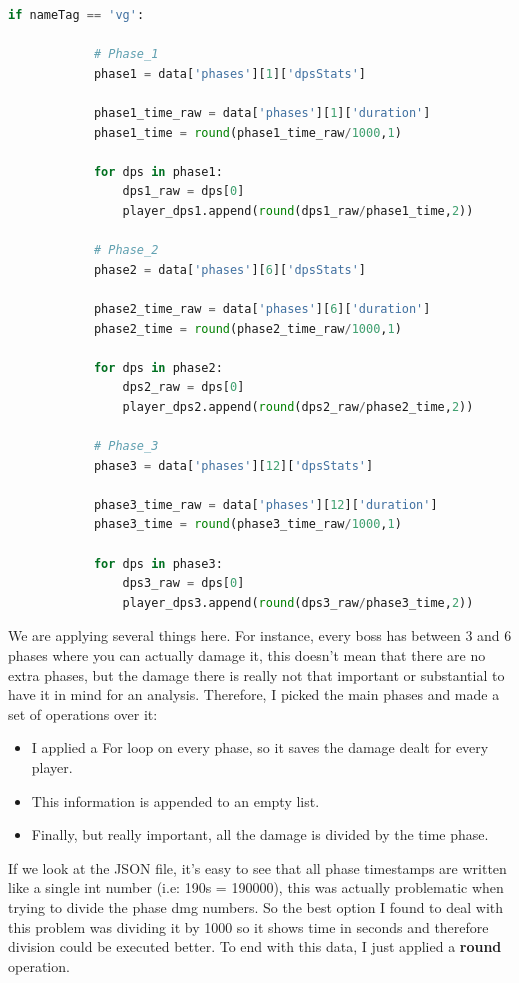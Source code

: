 \documentclass[12pt,a4paper]{article}
\begin{document}
    \begin{lstlisting}[language=Python]
    if nameTag == 'vg':

            # Phase_1
            phase1 = data['phases'][1]['dpsStats']

            phase1_time_raw = data['phases'][1]['duration']
            phase1_time = round(phase1_time_raw/1000,1)

            for dps in phase1:
                dps1_raw = dps[0]
                player_dps1.append(round(dps1_raw/phase1_time,2))

            # Phase_2
            phase2 = data['phases'][6]['dpsStats']

            phase2_time_raw = data['phases'][6]['duration']
            phase2_time = round(phase2_time_raw/1000,1)

            for dps in phase2:
                dps2_raw = dps[0]
                player_dps2.append(round(dps2_raw/phase2_time,2))

            # Phase_3
            phase3 = data['phases'][12]['dpsStats']

            phase3_time_raw = data['phases'][12]['duration']
            phase3_time = round(phase3_time_raw/1000,1)

            for dps in phase3:
                dps3_raw = dps[0]
                player_dps3.append(round(dps3_raw/phase3_time,2))
    \end{lstlisting}

    \newpage

    We are applying several things here. For instance, every boss has between 3 and 6 phases where you can actually damage it,
    this doesn't mean that there are no extra phases, but the damage there is really not that important or substantial to have
    it in mind for an analysis. Therefore, I picked the main phases and made a set of operations over it:

    \begin{itemize}
        \item I applied a For loop on every phase, so it saves the damage dealt for every player.
        \item This information is appended to an empty list.
        \item Finally, but really important, all the damage is divided by the time phase.
    \end{itemize}

    \bigskip

    If we look at the JSON file, it's easy to see that all phase timestamps are written like a single int number (i.e: 190s = 190000),
    this was actually problematic when trying to divide the phase dmg numbers. So the best option I found to deal with this problem
    was dividing it by 1000 so it shows time in seconds and therefore division could be executed better. To end with this data, I just
    applied a \textbf{round} operation.
\end{document}
